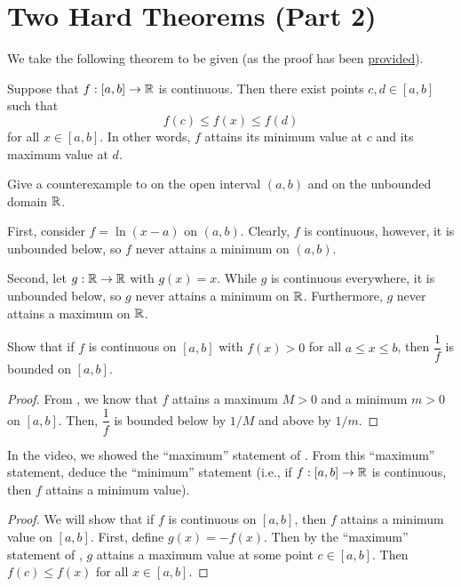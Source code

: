 \section{Two Hard Theorems (Part 2)}


\begin{callout}
  We take the following theorem to be given (as the proof has been
  \href{https://youtu.be/39ntUHbmXpc}{provided}).
  \begin{theorem}
  \label{thm:extreme-value-theorem}
    Suppose that $f : [a, b] \to \mathbb{R}$ is continuous. Then there exist points $c, d \in [a, b]$ such that
    \[
      f(c) \leq f(x) \leq f(d)
    \]
    for all $x \in [a, b]$. In other words, $f$ attains its minimum value at
    $c$ and its maximum value at $d$.
  \end{theorem}
\end{callout}

\begin{problem}
  Give a counterexample to  on the open
  interval $(a, b)$ and on the unbounded domain $\mathbb{R}$. 
  
  \vspace{\baselineskip}

  First, consider $f = \ln(x - a)$ on $(a, b)$.  Clearly, $f$ is
  continuous, however, it is unbounded below, so $f$ never attains a minimum on
  $(a, b)$.
  
  Second, let $g : \mathbb{R} \to \mathbb{R}$ with $g(x) = x$. While $g$ is continuous everywhere, it is
  unbounded below, so $g$ never attains a minimum on $\mathbb{R}$. Furthermore, $g$
  never attains a maximum on $\mathbb{R}$.
\end{problem}

\begin{problem}
  Show that if $f$ is continuous on $[a,b]$ with $f(x) > 0$ for all $a \leq x \leq b$,
  then $\dfrac{1}{f}$ is bounded on $[a,b]$. 

  \begin{proof}
    From , we know that $f$ attains a maximum
    $M > 0$ and a minimum $m > 0$ on $[a,b]$. Then, $\dfrac{1}{f}$ is bounded
    below by $1/M$ and above by $1/m$.
  \end{proof}

\end{problem}

\begin{problem}
  In the video, we showed the ``maximum'' statement of
  . From this ``maximum'' statement, deduce
  the ``minimum'' statement (i.e., if $f : [a,b] \to \mathbb{R}$ is continuous, then
  $f$ attains a minimum value). 

  \begin{proof}
    We will show that if $f$ is continuous on $[a,b]$, then $f$ attains a minimum
    value on $[a,b]$.
    First, define $g(x) = -f(x)$. Then by the ``maximum'' statement of ,
    $g$ attains a maximum value at some point $c \in [a,b]$. Then $f(c) \leq f(x)$ for all $x \in [a,b]$.
  \end{proof}

\end{problem}

